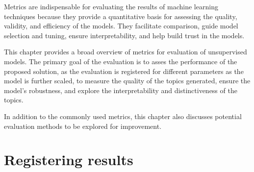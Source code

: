 Metrics are indispensable for evaluating the results of machine learning techniques because they provide a quantitative basis for assessing the quality, validity, and efficiency of the models. They facilitate comparison, guide model selection and tuning, ensure interpretability, and help build trust in the models. 

This chapter provides a broad overview of metrics for evaluation of unsupervised models. The primary goal of the evaluation is to asses the performance of the proposed solution, as the evaluation is registered for different parameters as the model is further scaled, to measure the quality of the topics generated, ensure the model's robustness, and explore the interpretability and distinctiveness of the topics. 


In addition to the commonly used metrics, this chapter also discusses potential evaluation methods to be explored for improvement.



\section{Registering results}



